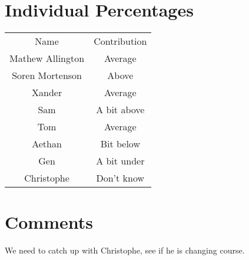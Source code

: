 \documentclass[12pt]{article}
\begin{document}
\maketitle


\section*{Individual Percentages}

\begin{center}
\begin{tabular}{ |c|c| } 
 \hline
 Name & Contribution \\ 
  Mathew Allington & Average \\ 
  Soren Mortenson & Above \\ 
   Xander & Average \\ 
   Sam &  A bit above\\ 
   Tom & Average \\
   Aethan & Bit below\\  
    Gen & A bit under \\  
   Christophe & Don't know \\  
 \hline
\end{tabular}
\end{center}
\section*{Comments}
We need to catch up with Christophe, see if he is changing course.
\end{document}
